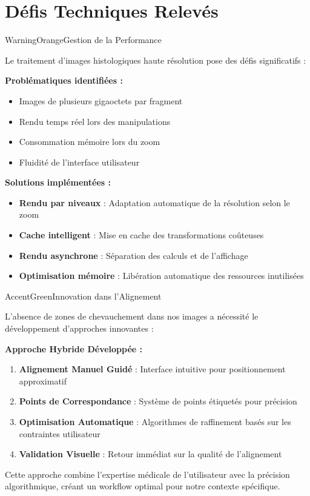 \documentclass[11pt,a4paper]{article}
\begin{document}
\section{Défis Techniques Relevés}

\begin{subsectionbox}{WarningOrange}{Gestion de la Performance}

Le traitement d'images histologiques haute résolution pose des défis significatifs :

\textbf{Problématiques identifiées :}
\begin{itemize}[leftmargin=*]
    \item Images de plusieurs gigaoctets par fragment
    \item Rendu temps réel lors des manipulations
    \item Consommation mémoire lors du zoom
    \item Fluidité de l'interface utilisateur
\end{itemize}

\textbf{Solutions implémentées :}
\begin{itemize}[leftmargin=*]
    \item \textbf{Rendu par niveaux} : Adaptation automatique de la résolution selon le zoom
    \item \textbf{Cache intelligent} : Mise en cache des transformations coûteuses
    \item \textbf{Rendu asynchrone} : Séparation des calculs et de l'affichage
    \item \textbf{Optimisation mémoire} : Libération automatique des ressources inutilisées
\end{itemize}

\end{subsectionbox}

\begin{subsectionbox}{AccentGreen}{Innovation dans l'Alignement}

L'absence de zones de chevauchement dans nos images a nécessité le développement d'approches innovantes :

\textbf{Approche Hybride Développée :}

\begin{enumerate}[leftmargin=*]
    \item \textbf{Alignement Manuel Guidé} : Interface intuitive pour positionnement approximatif
    \item \textbf{Points de Correspondance} : Système de points étiquetés pour précision
    \item \textbf{Optimisation Automatique} : Algorithmes de raffinement basés sur les contraintes utilisateur
    \item \textbf{Validation Visuelle} : Retour immédiat sur la qualité de l'alignement
\end{enumerate}

Cette approche combine l'expertise médicale de l'utilisateur avec la précision algorithmique, créant un workflow optimal pour notre contexte spécifique.

\end{subsectionbox}
\end{document}
